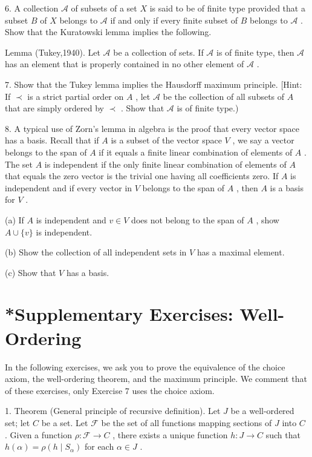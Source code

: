 6. A collection \(\mathcal{A}\) of subsets of a set \(X\) is said to be of finite type provided that a subset \(B\) of \(X\) belongs to \(\mathcal{A}\) if and only if every finite subset of \(B\) belongs to \(\mathcal{A}\) . Show that the Kuratowski lemma implies the following.

Lemma (Tukey,1940). Let \(\mathcal{A}\) be a collection of sets. If \(\mathcal{A}\) is of finite type, then \(\mathcal{A}\) has an element that is properly contained in no other element of \(\mathcal{A}\) .

7. Show that the Tukey lemma implies the Hausdorff maximum principle. [Hint: If \(\prec\) is a strict partial order on \(A\) , let \(\mathcal{A}\) be the collection of all subsets of \(A\) that are simply ordered by \(\prec\) . Show that \(\mathcal{A}\) is of finite type.)

8. A typical use of Zorn's lemma in algebra is the proof that every vector space has a basis. Recall that if \(A\) is a subset of the vector space \(V\) , we say a vector belongs to the span of \(A\) if it equals a finite linear combination of elements of \(A\) . The set \(A\) is independent if the only finite linear combination of elements of \(A\) that equals the zero vector is the trivial one having all coefficients zero. If \(A\) is independent and if every vector in \(V\) belongs to the span of \(A\) , then \(A\) is a basis for \(V\) .

(a) If \(A\) is independent and \(v \in  V\) does not belong to the span of \(A\) , show \(A \cup  \{ v\}\) is independent.

(b) Show the collection of all independent sets in \(V\) has a maximal element.

(c) Show that \(V\) has a basis.

\section*{*Supplementary Exercises: Well-Ordering}

In the following exercises, we ask you to prove the equivalence of the choice axiom, the well-ordering theorem, and the maximum principle. We comment that of these exercises, only Exercise 7 uses the choice axiom.

1. Theorem (General principle of recursive definition). Let \(J\) be a well-ordered set; let \(C\) be a set. Let \(\mathcal{F}\) be the set of all functions mapping sections of \(J\) into \(C\) . Given a function \(\rho  : \mathcal{F} \rightarrow  C\) , there exists a unique function \(h : J \rightarrow  C\) such that \(h\left( \alpha \right)  = \rho \left( {h \mid  {S}_{\alpha }}\right)\) for each \(\alpha  \in  J\) .

